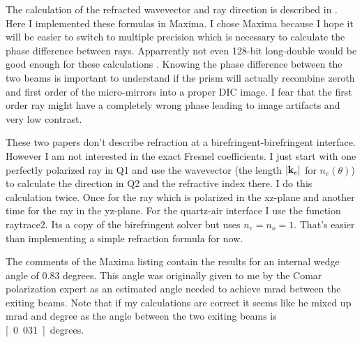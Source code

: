 The calculation of the refracted wavevector and ray direction is
described in \citep{Lekner1991,Weidlich2008}. Here I implemented these
formulas in Maxima. I chose Maxima because I hope it will be easier to
switch to multiple precision which is necessary to calculate the phase
difference between rays. Apparrently not even 128-bit long-double
would be good enough for these calculations \cite{Lekner1991}. Knowing
the phase difference between the two beams is important to understand
if the prism will actually recombine zeroth and first order of the
micro-mirrors into a proper DIC image. I fear that the first order ray
might have a completely wrong phase leading to image artifacts and
very low contrast.

These two papers don't describe refraction at a
birefringent-birefringent interface. However I am not interested in
the exact Fresnel coefficients. I just start with one perfectly
polarized ray in Q1 and use the wavevector (the length $|\mathbf{k}_e|$
for $n_e(\theta)$) to calculate the direction in Q2 and the refractive
index there. I do this calculation twice. Once for the ray which is
polarized in the xz-plane and another time for the ray in the
yz-plane.  For the quartz-air interface I use the function raytrace2.
Its a copy of the birefringent solver but uses $n_e=n_o=1$. That's
easier than implementing a simple refraction formula for now.

The comments of the Maxima listing contain the results for an internal
wedge angle of 0.83 degrees. This angle was originally given to me by
the Comar polarization expert as an estimated angle needed to achieve
\unit[32]{mrad} between the exiting beams. Note that if my
calculations are correct it seems like he mixed up mrad and degree as
the angle between the two exiting beams is \unit[0.031]{degrees}.

